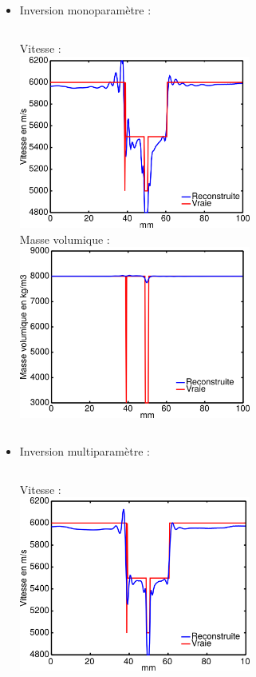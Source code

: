 \subsection*{}
\begin{frame}{\insertsectionhead}
\begin{small}
\begin{itemize}
	\item Inversion monoparamètre : \\[0.2cm]
	\begin{columns}
		\centering
		Vitesse : \\[0.2cm]
		\includegraphics[width=0.6\textwidth]{img/multi/coupe_vp_mono_smooth_hor.png}\\
		\centering
		Masse volumique  : \\[0.2cm]
		\includegraphics[width=0.6\textwidth]{img/multi/coupe_rho_mono.png}\\
	\end{columns}
	\item Inversion multiparamètre : \\[0.2cm]
	\begin{columns}
		\column{0.5\textwidth}
		\centering
		Vitesse : \\[0.2cm]
		\includegraphics[width=0.6\textwidth]{img/multi/coupe_vp_multi.png}\\

\end{columns}
\end{itemize}
\end{small}
\end{frame}
